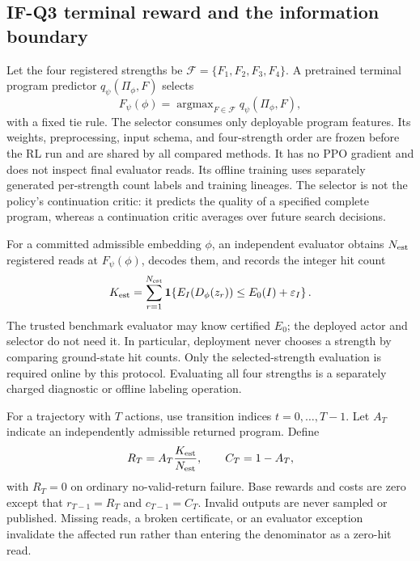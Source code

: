 \subsection{IF-Q3 terminal reward and the information boundary}
\label{sec:rl-q3}

Let the four registered strengths be \(\mathcal F=\{F_1,F_2,F_3,F_4\}\). A pretrained terminal
program predictor \(q_\psi(\Pi_\phi,F)\) selects
\begin{equation}
 F_\psi(\phi)=\mathop{\arg\max}_{F\in\mathcal F}q_\psi(\Pi_\phi,F),
 \label{eq:rl-strength-selector}
\end{equation}
with a fixed tie rule. The selector consumes only deployable program features. Its weights,
preprocessing, input schema, and four-strength order are frozen before the RL run and are shared by
all compared methods. It has no PPO gradient and does not inspect final evaluator reads. Its offline
training uses separately generated per-strength count labels and training lineages. The selector is
not the policy's continuation critic: it predicts the quality of a specified complete program,
whereas a continuation critic averages over future search decisions.

For a committed admissible embedding \(\phi\), an independent evaluator obtains \(N_{\rm est}\)
registered reads at \(F_\psi(\phi)\), decodes them, and records the integer hit count
\begin{equation}
 K_{\rm est}=\sum_{r=1}^{N_{\rm est}}
 \mathbf 1\!\left\{E_I(D_\phi(z_r))\le E_0(I)+\varepsilon_I\right\}.
 \label{eq:rl-terminal-count}
\end{equation}
The trusted benchmark evaluator may know certified \(E_0\); the deployed actor and selector do not
need it. In particular, deployment never chooses a strength by comparing ground-state hit counts.
Only the selected-strength evaluation is required online by this protocol. Evaluating all four
strengths is a separately charged diagnostic or offline labeling operation.

For a trajectory with \(T\) actions, use transition indices \(t=0,\ldots,T-1\). Let \(A_T\)
indicate an independently admissible returned program. Define
\begin{equation}
 R_T=A_T\frac{K_{\rm est}}{N_{\rm est}},\qquad C_T=1-A_T,
 \label{eq:rl-terminal-outcome}
\end{equation}
with \(R_T=0\) on ordinary no-valid-return failure. Base rewards and costs are zero except that
\(r_{T-1}=R_T\) and \(c_{T-1}=C_T\). Invalid outputs are never sampled or published. Missing
reads, a broken certificate, or an evaluator exception invalidate the affected run rather than
entering the denominator as a zero-hit read.

